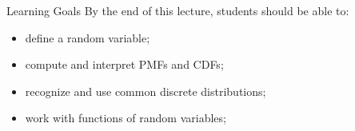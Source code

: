\setcounter{framenumber}{0}

\begin{frame}
  \titlepage
\end{frame}

\begin{frame}{Learning Goals}
By the end of this lecture, students should be able to:

\begin{itemize}
    \item define a random variable;
    \item compute and interpret PMFs and CDFs;
    \item recognize and use common discrete distributions;
    \item work with functions of random variables;
\end{itemize}
\end{frame}


